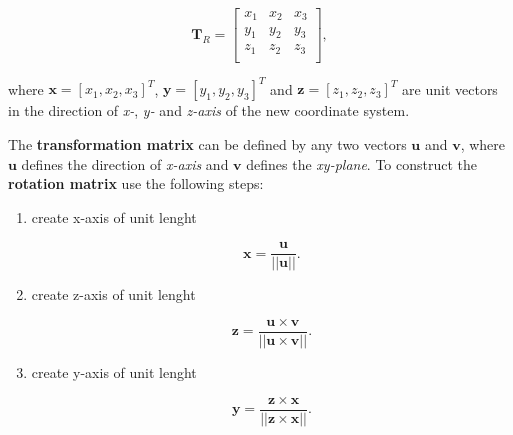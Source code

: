 \begin{enumerate}
        \begin{equation}
            \mathbf{T}_{R} = \begin{bmatrix}
                x_1 & x_2 & x_3 \\
                y_1 & y_2 & y_3 \\
                z_1 & z_2 & z_3 \\
            \end{bmatrix}
        ,\end{equation}

        where $\mathbf{x} = [x_1, x_2, x_3]^{T}$, $\mathbf{y} = [y_1, y_2, y_3]^{T}$
        and  $\mathbf{z} = [z_1, z_2, z_3]^{T}$ are unit vectors in the direction
        of \textit{x-}, \textit{y-} and \textit{z-axis} of the new coordinate
        system.


        \begin{bbox}[0.85]
            The \textbf{transformation matrix} can be defined by any two vectors
            $\mathbf{u}$ and $\mathbf{v}$, where $\mathbf{u}$ defines the direction
            of \textit{x-axis} and $\mathbf{v}$ defines the \textit{xy-plane}.
            To construct the \textbf{rotation matrix} use the following steps:

            \begin{enumerate}
                \item create x-axis of unit lenght

                    \begin{equation}
                        \mathbf{x} = \frac{\mathbf{u}}{||\mathbf{u}||}
                    .\end{equation}

                \item create z-axis of unit lenght

                    \begin{equation}
                        \mathbf{z}
                        = \frac{\mathbf{u} \times \mathbf{v}}{||\mathbf{u} \times \mathbf{v}||}
                    .\end{equation}

                \item create y-axis of unit lenght

                    \begin{equation}
                        \mathbf{y}
                        = \frac{\mathbf{z} \times \mathbf{x}}{||\mathbf{z} \times \mathbf{x}||}
                    .\end{equation}


\end{enumerate}
\end{bbox}
\end{enumerate}
